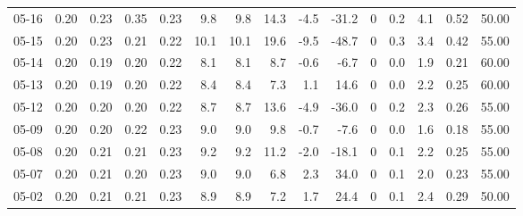 \begin{threeparttable}
{\begin{tabular}{lrrrrrrrrrrrrrr}
  05-16 &          0.20 &          0.23 &          0.35 &        0.23 &                 9.8 &                9.8 &                14.3 &       -4.5 &        -31.2 &              0 &                 0.2 &              4.1 &            0.52 &                  50.00 \\
  05-15 &          0.20 &          0.23 &          0.21 &        0.22 &                10.1 &               10.1 &                19.6 &       -9.5 &        -48.7 &              0 &                 0.3 &              3.4 &            0.42 &                  55.00 \\
  05-14 &          0.20 &          0.19 &          0.20 &        0.22 &                 8.1 &                8.1 &                 8.7 &       -0.6 &         -6.7 &              0 &                 0.0 &              1.9 &            0.21 &                  60.00 \\
  05-13 &          0.20 &          0.19 &          0.20 &        0.22 &                 8.4 &                8.4 &                 7.3 &        1.1 &         14.6 &              0 &                 0.0 &              2.2 &            0.25 &                  60.00 \\
  05-12 &          0.20 &          0.20 &          0.20 &        0.22 &                 8.7 &                8.7 &                13.6 &       -4.9 &        -36.0 &              0 &                 0.2 &              2.3 &            0.26 &                  55.00 \\
  05-09 &          0.20 &          0.20 &          0.22 &        0.23 &                 9.0 &                9.0 &                 9.8 &       -0.7 &         -7.6 &              0 &                 0.0 &              1.6 &            0.18 &                  55.00 \\
  05-08 &          0.20 &          0.21 &          0.21 &        0.23 &                 9.2 &                9.2 &                11.2 &       -2.0 &        -18.1 &              0 &                 0.1 &              2.2 &            0.25 &                  55.00 \\
  05-07 &          0.20 &          0.21 &          0.20 &        0.23 &                 9.0 &                9.0 &                 6.8 &        2.3 &         34.0 &              0 &                 0.1 &              2.0 &            0.23 &                  55.00 \\
  05-02 &          0.20 &          0.21 &          0.21 &        0.23 &                 8.9 &                8.9 &                 7.2 &        1.7 &         24.4 &              0 &                 0.1 &              2.4 &            0.29 &                  50.00 \\

\end{tabular}}
\end{threeparttable}
